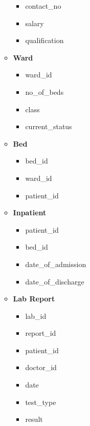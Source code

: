 \documentclass{article}
\begin{document}
\begin{itemize}
\begin{itemize}
\begin{itemize}
                    \item contact\_no
                    \item salary
                    \item qualification
                \end{itemize}
            \item \textbf{Ward}
                \begin{itemize}
                    \item {\color{blue}ward\_id}
                    \item no\_of\_beds
                    \item class
                    \item current\_status
                \end{itemize}
            \item \textbf{Bed}
                \begin{itemize}
                    \item {\color{blue}bed\_id}
                    \item {\color{red}ward\_id}
                    \item {\color{red}patient\_id}
                \end{itemize}
            \item \textbf{Inpatient}
                \begin{itemize}
                    \item {\color{blue}patient\_id}
                    \item {\color{red}bed\_id}
                    \item date\_of\_admission
                    \item date\_of\_discharge
                \end{itemize}
            \item \textbf{Lab Report}
                \begin{itemize}
                    \item {\color{blue}lab\_id}
                    \item {\color{blue}report\_id}
                    \item {\color{red}patient\_id}
                    \item {\color{red}doctor\_id}
                    \item date
                    \item test\_type
                    \item result

\end{itemize}
\end{itemize}
\end{itemize}
\end{document}

